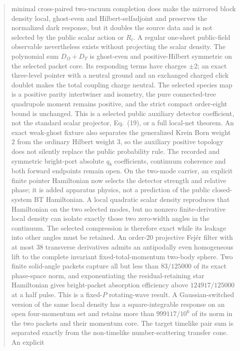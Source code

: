 \documentclass[11pt]{article}
\theoremstyle{definition}
\theoremstyle{remark}
\begin{document}
\begin{abstract}
minimal cross-paired two-vacuum completion does make the mirrored block
density local, ghost-even and Hilbert-selfadjoint and preserves the normalized
dark response, but it doubles the source data and is not selected by the
public scalar action or $R_t$.
A regular one-sheet public-field observable nevertheless exists without
projecting the scalar density.  The polynomial sum
$D_\Omega+D_\Upsilon$ is ghost-even and positive-Hilbert symmetric on the
selected packet core.  Its responding terms have charges $\pm2$; an exact
three-level pointer with a neutral ground and an exchanged charged click
doublet makes the total coupling charge neutral.  The selected species map
is a positive parity intertwiner and isometry, the pure connected-tree
quadrupole moment remains positive, and the strict compact order-eight bound
is unchanged.  This is a selected public auxiliary detector coefficient,
not the standard scalar projector, Eq.~(19), or a full local-net theorem.
An exact weak-ghost fixture also separates the generalized Krein Born weight
$2$ from the ordinary Hilbert weight $3$, so the auxiliary positive topology
does not silently replace the public probability rule.  The recorded and
symmetric bright-port absolute $q_8$ coefficients, continuum
coherence and both forward endpoints remain open.  On the two-mode carrier,
an explicit finite pointer Hamiltonian now selects the detector strength and
relative phase; it is added apparatus physics, not a prediction of the public
closed-system BT Hamiltonian.  A local quadratic scalar density reproduces
that Hamiltonian on the two selected modes, but no nonzero finite-derivative
local density can isolate exactly those two zero-width angles in the
continuum.  The selected compression is therefore exact while its leakage
into other angles must be retained.  An order-20 projective Fej\'er filter
with at most 38 transverse derivatives admits an antipodally even homogeneous
lift to the complete invariant fixed-total-momentum two-body sphere.  Two
finite solid-angle packets capture all but less than $83/125000$ of its exact
phase-space norm, and exponentiating the residual-retaining star Hamiltonian
gives bright-packet absorption efficiency above $124917/125000$ at a half
pulse.  This is a fixed-$P$ rotating-wave result.  A Gaussian-switched version
of the same local density has a square-integrable response on an open
four-momentum set and retains more than $999117/10^6$ of its norm in the two
packets and their momentum core.  The target timelike pair sum is separated
exactly from the non-timelike number-scattering transfer cone.  An explicit

\end{abstract}
\end{document}
